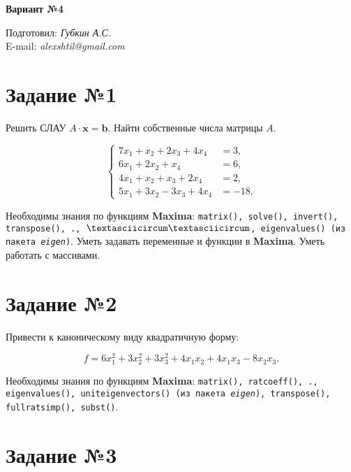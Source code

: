 \begin{center}
    \textbf{\huge Вариант №4}
\end{center}

\begin{flushright}
    Подготовил: \textit{Губкин А.С.}\\
    E-mail: \textit{alexshtil@gmail.com}\\
\end{flushright}

\section*{Задание №1}

    Решить СЛАУ $A \cdot \mathbf{x} = \mathbf{b}$. Найти собственные числа матрицы $A$.

    \[
        \left\{
            \begin{aligned}
                7 x_{1} + x_{2} + 2 x_{3} + 4 x_{4} &= 3,\\
                6 x_{1} + 2 x_{2} + x_{4} &= 6,\\
                4 x_{1} + x_{2} + x_{3} + 2 x_{4} &= 2,\\
                5 x_{1} + 3 x_{2} - 3 x_{3} + 4 x_{4} &= -18.
            \end{aligned}
        \right.
    \]
    
    Необходимы знания по функциям \textbf{Maxima}: {\tt matrix(), solve(), invert(), transpose(), ., $\textasciicircum \textasciicircum$, eigenvalues() (из пакета \textit{eigen})}. Уметь задавать переменные и функции в \textbf{Maxima}. Уметь работать с массивами.

\section*{Задание №2}

	Привести к каноническому виду квадратичную форму: 

	\[
		f = 6 x^{2}_{1} + 3 x^{2}_{2} + 3 x^{2}_{3} + 4 x_{1} x_{2} + 4 x_{1} x_{3} - 8 x_{2} x_{3}.
	\]

	Необходимы знания по функциям \textbf{Maxima}: {\tt matrix(), ratcoeff(), ., eigenvalues(), uniteigenvectors() (из пакета \textit{eigen}), transpose(), fullratsimp(), subst()}.

\section*{Задание №3}


